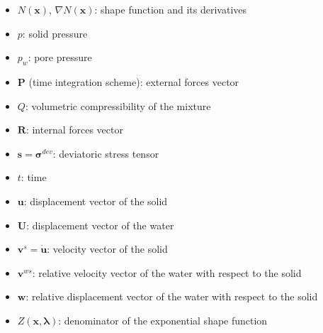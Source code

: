 \documentclass[twocolumn]{svjour3}          %
\begin{document}
\begin{itemize}
\item $N(\boldsymbol{x})$, $\nabla N(\boldsymbol{x})$: shape function and its derivatives
\item $p$: solid pressure
\item $p_w$: pore pressure
\item $\boldsymbol{P}$ (time integration scheme): external forces vector
\item $Q$: volumetric compressibility of the mixture
\item $\boldsymbol{R}$: internal forces vector
\item $\boldsymbol{s}=\boldsymbol{\sigma}^{dev}$: deviatoric stress tensor
\item $t$: time
\item $\boldsymbol{u}$: displacement vector of the solid
\item $\boldsymbol{U}$: displacement vector of the water
\item $\boldsymbol{v}^s=\boldsymbol{\dot{u}}$: velocity vector of the solid
\item $\boldsymbol{v}^{ws}$: relative velocity vector of the water with respect to the solid
\item $\boldsymbol{w}$: relative displacement vector of the water with respect to the solid
\item $Z(\boldsymbol{x},\boldsymbol{\lambda})$: denominator of the exponential shape function


\end{itemize}
\end{document}
